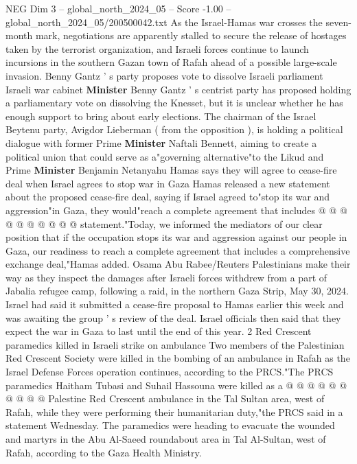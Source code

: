 \begin{textsample}{NEG Dim 3 – global\_north\_2024\_05 – Score -1.00 – global\_north\_2024\_05/200500042.txt}  \label{ex:f3_neg_438}
As the Israel-Hamas war crosses the seven-month mark, negotiations are apparently stalled to secure the release of hostages taken by the terrorist organization, and Israeli forces continue to launch incursions in the southern Gazan town of Rafah ahead of a possible large-scale invasion.
Benny Gantz ' s party proposes vote to dissolve Israeli parliament Israeli war cabinet \textbf{Minister} Benny Gantz ' s centrist party has proposed holding a parliamentary vote on dissolving the Knesset, but it is unclear whether he has enough support to bring about early elections.
The chairman of the Israel Beytenu party, Avigdor Lieberman ( from the opposition ), is holding a political dialogue with former Prime \textbf{Minister} Naftali Bennett, aiming to create a political union that could serve as a"governing alternative"to the Likud and Prime \textbf{Minister} Benjamin Netanyahu Hamas says they will agree to cease-fire deal when Israel agrees to stop war in Gaza Hamas released a new statement about the proposed cease-fire deal, saying if Israel agreed to"stop its war and aggression"in Gaza, they would"reach a complete agreement that includes @ @ @ @ @ @ @ @ @ @ statement."Today, we informed the mediators of our clear position that if the occupation stops its war and aggression against our people in Gaza, our readiness to reach a complete agreement that includes a comprehensive exchange deal,"Hamas added.
Osama Abu Rabee/Reuters Palestinians make their way as they inspect the damages after Israeli forces withdrew from a part of Jabalia refugee camp, following a raid, in the northern Gaza Strip, May 30, 2024.
Israel had said it submitted a cease-fire proposal to Hamas earlier this week and was awaiting the group ' s review of the deal.
Israel officials then said that they expect the war in Gaza to last until the end of this year. 2 Red Crescent paramedics killed in Israeli strike on ambulance Two members of the Palestinian Red Crescent Society were killed in the bombing of an ambulance in Rafah as the Israel Defense Forces operation continues, according to the PRCS."The PRCS paramedics Haitham Tubasi and Suhail Hassouna were killed as a @ @ @ @ @ @ @ @ @ @ Palestine Red Crescent ambulance in the Tal Sultan area, west of Rafah, while they were performing their humanitarian duty,"the PRCS said in a statement Wednesday.
The paramedics were heading to evacuate the wounded and martyrs in the Abu Al-Saeed roundabout area in Tal Al-Sultan, west of Rafah, according to the Gaza Health Ministry.

\end{textsample}
